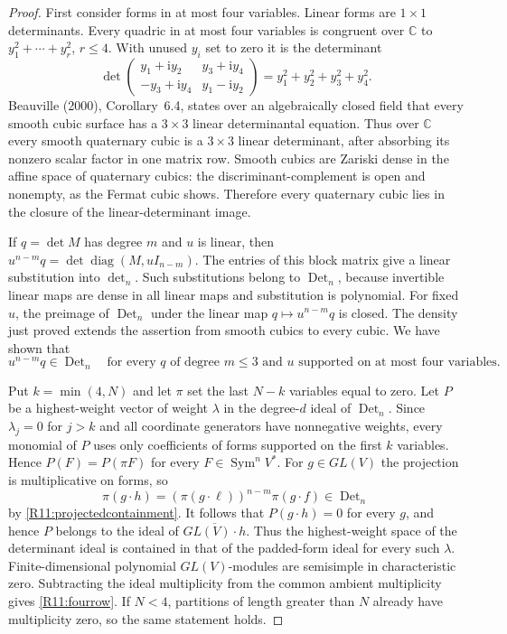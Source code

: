 \begin{proof}
First consider forms in at most four variables. Linear forms are
$1\times1$ determinants. Every quadric in at most four variables
is congruent over $\mathbb C$ to $y_1^2+\cdots+y_r^2$, $r\leq4$.
With unused $y_i$ set to zero it is the determinant
\begin{equation}\label{R11:quadric}
 \det\begin{pmatrix}
 y_1+\mathrm i y_2&y_3+\mathrm i y_4\\
 -y_3+\mathrm i y_4&y_1-\mathrm i y_2
 \end{pmatrix}=
 y_1^2+y_2^2+y_3^2+y_4^2.
\end{equation}
Beauville (2000), Corollary~6.4, states over an algebraically
closed field that every smooth cubic surface has a $3\times3$
linear determinantal equation. Thus over $\mathbb C$ every smooth
quaternary cubic is a $3\times3$ linear determinant, after
absorbing its nonzero scalar factor in one matrix row.
Smooth cubics are Zariski dense in the affine space of quaternary
cubics: the discriminant-complement is open and nonempty, as the
Fermat cubic shows. Therefore every quaternary cubic lies in the
closure of the linear-determinant image.

If $q=\det M$ has degree $m$ and $u$ is linear, then
$u^{n-m}q=\det\operatorname{diag}(M,uI_{n-m})$.
The entries of this block matrix give a linear substitution into
$\det_n$. Such substitutions belong to $\operatorname{Det}_n$,
because invertible linear maps are dense in all linear maps and
substitution is polynomial. For fixed $u$, the preimage of
$\operatorname{Det}_n$ under the linear map $q\mapsto u^{n-m}q$
is closed. The density just proved extends the assertion from
smooth cubics to every cubic. We have shown that
\begin{equation}\label{R11:projectedcontainment}
 u^{n-m}q\in\operatorname{Det}_n
 \quad\text{for every }q\text{ of degree }m\leq3
 \text{ and }u\text{ supported on at most four variables}.
\end{equation}

Put $k=\min(4,N)$ and let $\pi$ set the last $N-k$ variables
equal to zero. Let $P$ be a highest-weight vector of weight
$\lambda$ in the degree-$d$ ideal of $\operatorname{Det}_n$.
Since $\lambda_j=0$ for $j>k$ and all coordinate generators have
nonnegative weights, every monomial of $P$ uses only coefficients
of forms supported on the first $k$ variables. Hence
$P(F)=P(\pi F)$ for every $F\in\operatorname{Sym}^nV^*$.
For $g\in GL(V)$ the projection is multiplicative on forms, so
\[
 \pi(g\cdot h)=(\pi(g\cdot\ell))^{n-m}\pi(g\cdot f)
 \in\operatorname{Det}_n
\]
by \eqref{R11:projectedcontainment}. It follows that
$P(g\cdot h)=0$ for every $g$, and hence $P$ belongs to the
ideal of $\overline{GL(V)\cdot h}$.
Thus the highest-weight space of the determinant ideal is
contained in that of the padded-form ideal for every such
$\lambda$. Finite-dimensional polynomial $GL(V)$-modules are
semisimple in characteristic zero. Subtracting the ideal
multiplicity from the common ambient multiplicity gives
\eqref{R11:fourrow}. If $N<4$, partitions of length greater than
$N$ already have multiplicity zero, so the same statement holds.
\end{proof}

